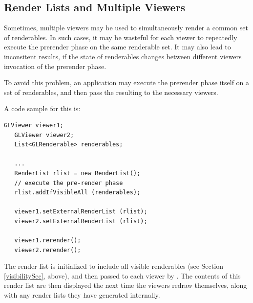 \documentclass{article}
\begin{document}
\subsection{Render Lists and Multiple Viewers}

Sometimes, multiple viewers may be used to simultaneously render a
common set of renderables. In such cases, it may be wasteful for each
viewer to repeatedly execute the prerender phase on the same
renderable set. It may also lead to inconsitent results, if the state
of renderables changes between different viewers invocation of the
prerender phase.

To avoid this problem, an application may execute the prerender
phase itself on a set of renderables, and then pass the
resulting  to the necessary viewers.

A code sample for this is:
\begin{lstlisting}[]
   GLViewer viewer1;
   GLViewer viewer2;
   List<GLRenderable> renderables;

   ...
   RenderList rlist = new RenderList();
   // execute the pre-render phase
   rlist.addIfVisibleAll (renderables);

   viewer1.setExternalRenderList (rlist);
   viewer2.setExternalRenderList (rlist);

   viewer1.rerender();
   viewer2.rerender();
\end{lstlisting}

The render list is initialized to include all visible renderables (see
Section \ref{visibilitySec}, above), and then passed to each viewer 
by . The contents
of this render list are then displayed the next time the viewers
redraw themselves, along with any render lists they have generated
internally.
\end{document}
